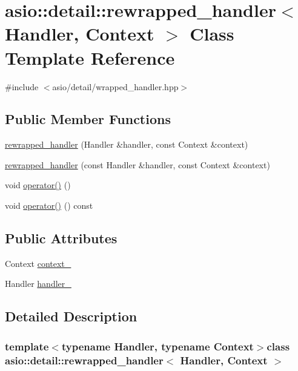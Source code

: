\hypertarget{classasio_1_1detail_1_1rewrapped__handler}{}\section{asio\+:\+:detail\+:\+:rewrapped\+\_\+handler$<$ Handler, Context $>$ Class Template Reference}
\label{classasio_1_1detail_1_1rewrapped__handler}


{\ttfamily \#include $<$asio/detail/wrapped\+\_\+handler.\+hpp$>$}

\subsection*{Public Member Functions}
\begin{DoxyCompactItemize}
\item 
\hyperlink{classasio_1_1detail_1_1rewrapped__handler_a12eb32aee9e6ba57fee26f1c022c4f74}{rewrapped\+\_\+handler} (Handler \&handler, const Context \&context)
\item 
\hyperlink{classasio_1_1detail_1_1rewrapped__handler_a9dbb8a8163fb5f3a2ad63056f3630907}{rewrapped\+\_\+handler} (const Handler \&handler, const Context \&context)
\item 
void \hyperlink{classasio_1_1detail_1_1rewrapped__handler_a51f6819010dd83f38dab75abf5f04ddd}{operator()} ()
\item 
void \hyperlink{classasio_1_1detail_1_1rewrapped__handler_ace8db3285235b2e17f7c17cf60da18df}{operator()} () const 
\end{DoxyCompactItemize}
\subsection*{Public Attributes}
\begin{DoxyCompactItemize}
\item 
Context \hyperlink{classasio_1_1detail_1_1rewrapped__handler_aa4d5ba2fb7339e10ce2092b9cd38c705}{context\+\_\+}
\item 
Handler \hyperlink{classasio_1_1detail_1_1rewrapped__handler_aaa272366eec7b6ab446361ab4e4323e9}{handler\+\_\+}
\end{DoxyCompactItemize}


\subsection{Detailed Description}
\subsubsection*{template$<$typename Handler, typename Context$>$class asio\+::detail\+::rewrapped\+\_\+handler$<$ Handler, Context $>$}



